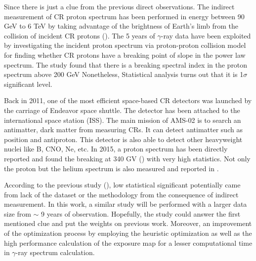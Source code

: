Since there is just a clue from the previous direct observations.
The indirect measurement of CR proton spectrum has been performed in
energy between 90 GeV to 6 TeV by taking advantage of the brightness of
Earth's limb from the collision of incident CR protons (\cite{FermiEarth14}).
The 5 years of $\gamma$-ray data have been exploited by investigating the incident proton spectrum via proton-proton collision model for finding whether CR protons have a breaking point of slope in the power 
law spectrum. The study found that there is a breaking spectral index
in the proton spectrum above 200 GeV 
Nonetheless, Statistical analysis turns out that it is 1$\sigma$
significant level.


Back in 2011, one of the most efficient
space-based CR detectors was launched by the carriage of Endeavor
space shuttle. The detector has been attached to the international space station (ISS). The main mission of AMS-02 is to search an 
antimatter, dark matter from measuring CRs. It can
detect antimatter such as position and antiproton. This detector
is also able to detect other heavyweight nuclei like B, CNO,
Ne, etc. In 2015, a proton spectrum has been directly
reported and found the breaking at 340 GV (\cite{AMS02pr2015})
with very high statistics. Not only the proton but the helium spectrum
is also measured and reported in \cite{Heliumflux2015}. 



According to the previous study (\cite{FermiEarth14}), 
low statistical significant potentially came from lack of the 
dataset or the methodology from the consequence of indirect
measurement. In this work, a similar study will be performed with 
a larger data size from $\sim$ 9 years of observation. Hopefully, 
the study could answer the first mentioned clue and put the weights
on previous work. Moreover, an improvement of the optimization
process by employing the heuristic optimization as well as the
high performance calculation of the exposure map for a lesser
computational time in $\gamma$-ray spectrum calculation. 